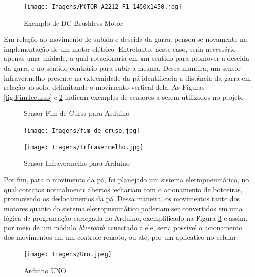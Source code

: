 \documentclass[deposito, acronym, symbols]{fei}
\begin{document}
\begin{figure}[!htb]
 \centering
    \caption{Exemplo de DC Brushless Motor}
    \texttt{[image: Imagens/MOTOR A2212 F1-1450x1450.jpg]}
    \label{fig:motor}
 \end{figure}


Em relação ao movimento de subida e descida da garra, pensou-se novamente na implementação de um motor elétrico. Entretanto, neste caso, seria necessário apenas uma unidade, a qual rotacionaria em um sentido para promover a descida da garra e no sentido contrário para subir a mesma. Dessa maneira, um sensor infravermelho presente na extremidade da pá identificaria a distância da garra em relação ao solo, delimitando o movimento vertical dela. As Figuras \ref{fig:Fimdecurso} e \ref{fig:Infravermelho} indicam exemplos de sensores a serem utilizados no projeto

 \begin{figure}[!htp]
  \centering
  \begin{minipage}{0.4\textwidth}
    \centering
    \caption{Sensor Fim de Curso para Arduino}
    \texttt{[image: Imagens/fim de cruso.jpg]}
    \label{fig:Fimdecurso}
  \end{minipage}
  \hfill
  \begin{minipage}{0.4\textwidth}
    \caption{Sensor Infravermelho para Arduino}
    \texttt{[image: Imagens/Infravermelho.jpg]}
    \label{fig:Infravermelho}
  \end{minipage}
\end{figure}

\newpage

Por fim, para o movimento da pá, foi planejado um sistema eletropneumático, no qual contatos normalmente abertos fechariam com o acionamento de botoeiras, promovendo os deslocamentos da pá. Dessa maneira, os movimentos tanto dos motores quanto do sistema eletropneumático poderiam ser convertidos em uma lógica de programação carregada no Arduino, exemplificado na Figura \ref{fig:Uno} e assim, por meio de um módulo \textit{bluetooth} conectado a ele, seria possível o acionamento dos movimentos em um controle remoto, ou até, por um aplicatico no celular.

\begin{figure}[!htb]
 \centering
    \caption{Arduino UNO}
    \texttt{[image: Imagens/Uno.jpeg]}
    \label{fig:Uno}
 \end{figure}
\end{document}
